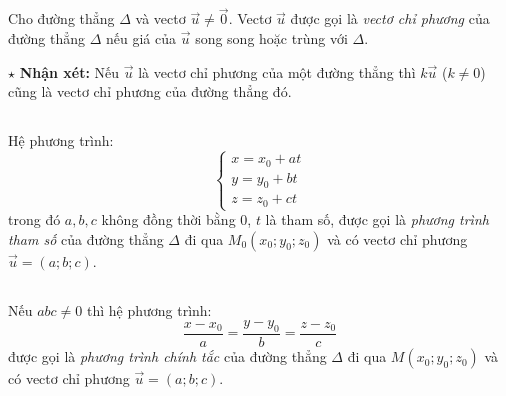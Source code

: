 \documentclass[12pt,a4paper]{extarticle}
\begin{document}
\makeheadbox[headerright={Chương 5},chude={Bài 2},tieude={Phương trình đường thẳng},dinhdang={Hình học},lop={12 },gv={Nguyễn Lê Minh Ngọc}]
\vspace{2em}
\section*{\color{myblue}{I. Phương trình đường thẳng}}
\subsection*{\color{myblue}{1. Vectơ chỉ phương của đường thẳng}}
\begin{tcolorbox}[colback=lightblue, colframe=myblue, arc=2mm]
Cho đường thẳng $\Delta$ và vectơ $\vec{u} \neq \vec{0}$. Vectơ $\vec{u}$ được gọi là \textit{vectơ chỉ phương} của đường thẳng $\Delta$ nếu giá của $\vec{u}$ song song hoặc trùng với $\Delta$.
\end{tcolorbox}
\noindent $\star$ \textbf{Nhận xét:} Nếu $\vec{u}$ là vectơ chỉ phương của một đường thẳng thì $k\vec{u}$ ($k \neq 0$) cũng là vectơ chỉ phương của đường thẳng đó.
\subsection*{\color{myblue}{2. Phương trình tham số của đường thẳng}}
\begin{tcolorbox}[colback=lightblue, colframe=myblue, arc=2mm]
Hệ phương trình:
\[
\begin{cases}
x = x_0 + at \\
y = y_0 + bt \\
z = z_0 + ct
\end{cases}
\]
trong đó $a, b, c$ không đồng thời bằng $0$, $t$ là tham số, được gọi là \textit{phương trình tham số} của đường thẳng $\Delta$ đi qua $M_0(x_0; y_0; z_0)$ và có vectơ chỉ phương $\vec{u} = (a; b; c)$.
\end{tcolorbox}
\subsection*{\color{myblue}{3. Phương trình chính tắc của đường thẳng}}
\begin{tcolorbox}[colback=lightblue, colframe=myblue, arc=2mm]
Nếu $abc \neq 0$ thì hệ phương trình:
\[
\frac{x - x_0}{a} = \frac{y - y_0}{b} = \frac{z - z_0}{c}
\]
được gọi là \textit{phương trình chính tắc} của đường thẳng $\Delta$ đi qua $M(x_0; y_0; z_0)$ và có vectơ chỉ phương $\vec{u} = (a; b; c)$.
\end{tcolorbox}
\end{document}

